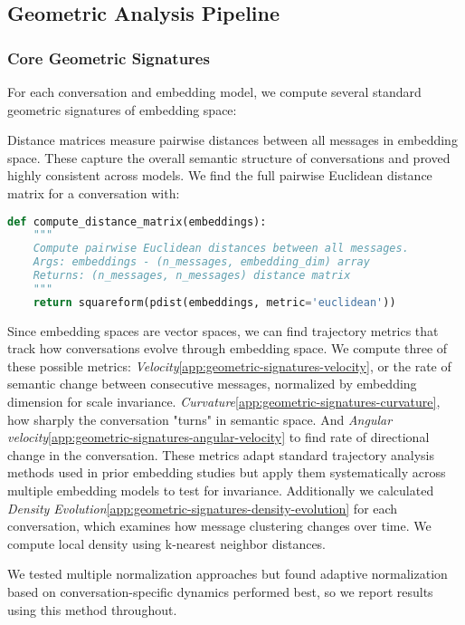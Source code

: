 \documentclass[11pt,letterpaper]{article}
\begin{document}
\subsection{Geometric Analysis Pipeline}

\subsubsection{Core Geometric Signatures}

For each conversation and embedding model, we compute several standard geometric signatures of embedding space:

Distance matrices measure pairwise distances between all messages in embedding space. These capture the overall semantic structure of conversations and proved highly consistent across models. We find the full pairwise Euclidean distance matrix for a conversation with:

\begin{lstlisting}[language=Python, basicstyle=\small]
def compute_distance_matrix(embeddings):
    """
    Compute pairwise Euclidean distances between all messages.
    Args: embeddings - (n_messages, embedding_dim) array
    Returns: (n_messages, n_messages) distance matrix
    """
    return squareform(pdist(embeddings, metric='euclidean'))
\end{lstlisting}

Since embedding spaces are vector spaces, we can find trajectory metrics that track how conversations evolve through embedding space. We compute three of these possible metrics: \textit{Velocity}\ref{app:geometric-signatures-velocity}, or the rate of semantic change between consecutive messages, normalized by embedding dimension for scale invariance. \textit{Curvature}\ref{app:geometric-signatures-curvature}, how sharply the conversation "turns" in semantic space. And \textit{Angular velocity}\ref{app:geometric-signatures-angular-velocity} to find rate of directional change in the conversation. These metrics adapt standard trajectory analysis methods used in prior embedding studies \citep{brinberg2024dynamic, palominos2024trajectories} but apply them systematically across multiple embedding models to test for invariance.
Additionally we calculated \textit{Density Evolution}\ref{app:geometric-signatures-density-evolution} for each conversation, which examines how message clustering changes over time. We compute local density using k-nearest neighbor distances.

We tested multiple normalization approaches but found adaptive normalization based on conversation-specific dynamics performed best, so we report results using this method throughout.
\end{document}
